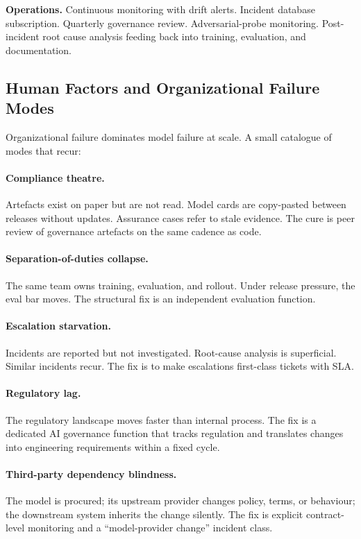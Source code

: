 \textbf{Operations.}
Continuous monitoring with drift alerts. Incident database
subscription. Quarterly governance review. Adversarial-probe
monitoring. Post-incident root cause analysis feeding back into
training, evaluation, and documentation.

\subsection{Human Factors and Organizational Failure Modes}

Organizational failure dominates model failure at scale. A small
catalogue of modes that recur:

\paragraph{Compliance theatre.} Artefacts exist on paper but are
not read. Model cards are copy-pasted between releases without
updates. Assurance cases refer to stale evidence. The cure is
peer review of governance artefacts on the same cadence as
code.

\paragraph{Separation-of-duties collapse.} The same team owns
training, evaluation, and rollout. Under release pressure, the
eval bar moves. The structural fix is an independent evaluation
function.

\paragraph{Escalation starvation.} Incidents are reported but
not investigated. Root-cause analysis is superficial. Similar
incidents recur. The fix is to make escalations first-class
tickets with SLA.

\paragraph{Regulatory lag.} The regulatory landscape moves
faster than internal process. The fix is a dedicated AI
governance function that tracks regulation and translates
changes into engineering requirements within a fixed cycle.

\paragraph{Third-party dependency blindness.} The model is
procured; its upstream provider changes policy, terms, or
behaviour; the downstream system inherits the change silently.
The fix is explicit contract-level monitoring and a
``model-provider change'' incident class.

